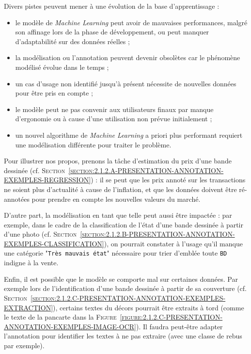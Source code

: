 			Divers pistes peuvent mener à une évolution de la base d'apprentissage :
			\begin{itemize}
				\item le modèle de \textit{Machine Learning} peut avoir de mauvaises performances, malgré son affinage lors de la phase de développement, ou peut manquer d'adaptabilité sur des données réelles ;
				\item la modélisation ou l'annotation peuvent devenir obsolètes car le phénomène modélisé évolue dans le temps ;
				\item un cas d'usage non identifié jusqu'à présent nécessite de nouvelles données pour être pris en compte ;
				\item le modèle peut ne pas convenir aux utilisateurs finaux par manque d'ergonomie ou à cause d'une utilisation non prévue initialement ;
				\item un nouvel algorithme de \textit{Machine Learning} a priori plus performant requiert une modélisation différente pour traiter le problème.
			\end{itemize}
			\begin{leftBarExamples}
				Pour illustrer nos propos, prenons la tâche d'estimation du prix d'une bande dessinée (cf. \textsc{Section~\ref{section:2.1.2.A-PRESENTATION-ANNOTATION-EXEMPLES-REGRESSION}}) : il se peut que les prix annoté sur les transactions ne soient plus d'actualité à cause de l'inflation, et que les données doivent être ré-annotées pour prendre en compte les nouvelles valeurs du marché.
				
				D'autre part, la modélisation en tant que telle peut aussi être impactée : par exemple, dans le cadre de la classification de l'état d'une bande dessinée à partir d'une photo (cf. \textsc{Section~\ref{section:2.1.2.B-PRESENTATION-ANNOTATION-EXEMPLES-CLASSIFICATION}}), on pourrait constater à l'usage qu'il manque une catégorie "\texttt{Très mauvais état}" nécessaire pour trier d’emblée toute \texttt{BD} indigne à la vente.
				
				Enfin, il est possible que le modèle se comporte mal sur certaines données.
				Par exemple lors de l'identification d'une bande dessinée à partir de sa couverture (cf. \textsc{Section~\ref{section:2.1.2.C-PRESENTATION-ANNOTATION-EXEMPLES-EXTRACTION}}), certains textes du décors pourrait être extraits à tord (comme le texte de la pancarte  dans la \textsc{Figure~\ref{figure:2.1.2.C-PRESENTATION-ANNOTATION-EXEMPLES-IMAGE-OCR}}).
				Il faudra peut-être adapter l'annotation pour identifier les textes à ne pas extraire (avec une classe de rebus par exemple).
			\end{leftBarExamples}
			
